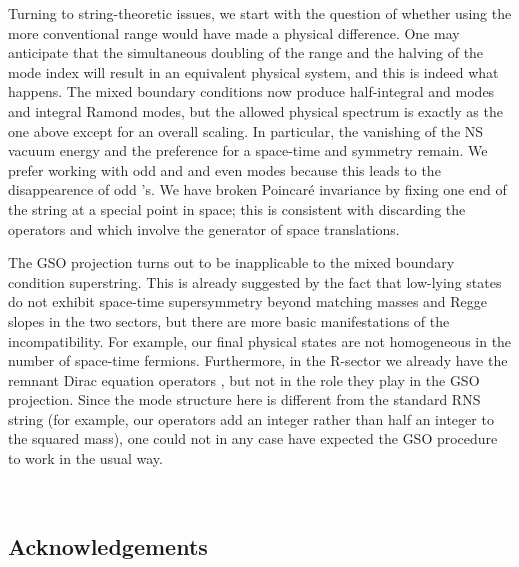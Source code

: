 \documentclass[a4paper,a4paper]{article}
\begin{document}
Turning to string-theoretic issues, we start with the question of whether
using the more conventional \myHighlight{$\sigma$}\coordHE{} range \myHighlight{$[0,\pi]$}\coordHE{} would have made a
physical difference. One may  anticipate that the simultaneous doubling of
the \myHighlight{$\sigma$}\coordHE{} range and the
halving of the mode index \coordHE{} will result in an equivalent physical
system,
and this is indeed what happens.  The mixed boundary conditions now produce
half-integral \myHighlight{$\alpha$}\coordHE{} and \coordHE{} modes and integral Ramond \coordHE{} modes, but
the allowed physical spectrum is exactly as the one above except for an
overall scaling.  In particular, the vanishing of the NS vacuum energy
and the preference for a \coordHE{} space-time and \coordHE{} symmetry remain.
We
prefer working with odd \myHighlight{$\alpha$}\coordHE{} and \coordHE{} and even \coordHE{} modes because this
leads to the disappearence of odd \coordHE{}'s.  We have broken
Poincar\'{e} invariance by fixing one end of the string at a
special point in space; this is consistent with discarding the
operators  \coordHE{} and \coordHE{} which involve the generator of space
translations.

The GSO projection turns out to be inapplicable to the mixed boundary
condition superstring.
This is already suggested by the fact that low-lying states do
not exhibit space-time supersymmetry beyond matching masses and Regge slopes
in the two sectors, but there are more basic manifestations of the
incompatibility. For example, our final physical states are not
homogeneous in the number of
space-time fermions.  Furthermore, in the R-sector we already have
the remnant Dirac equation operators \coordHE{}, but not in the role
they play in the GSO projection. Since the mode structure here is
different from the standard RNS string (for example, our \coordHE{} operators
add an integer rather than half  an integer to the squared mass), one
could not in any case have expected the GSO procedure to work in the usual
way.



\

\subsection*{Acknowledgements}
\end{document}
